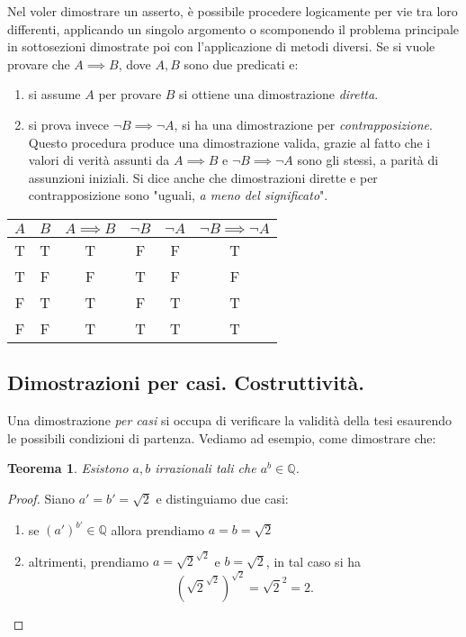 \documentclass[fontsize = 11 pt, paper=A4, oneside, index=totoc, hyperref]{article}
\theoremstyle{definition}
\theoremstyle{plain}
\newtheorem{thm}{Teorema}[section]
\begin{document}
Nel voler dimostrare un asserto, è possibile procedere logicamente per vie tra loro differenti, applicando un singolo argomento o scomponendo il problema principale in sottosezioni dimostrate poi con l'applicazione di metodi diversi.
Se si vuole provare che \(A \implies B\), dove \(A,B\) sono due predicati e:
\begin{enumerate}
  \item si assume \(A\) per provare \(B\) si ottiene una dimostrazione \emph{diretta}.
  \item si prova invece \(\lnot B \implies \lnot A\), si ha una dimostrazione per \emph{contrapposizione}. Questo procedura produce una dimostrazione valida, grazie al fatto che i valori di verità assunti da \(A \implies B\) e \(\lnot B \implies \lnot A\) sono gli stessi, a parità di assunzioni iniziali. Si dice anche che dimostrazioni dirette e per contrapposizione sono "uguali, \emph{a meno del significato}".
\end{enumerate}
\begin{center}
\begin{tabular}{c|c|c||c|c|c}
  \(A\) & \(B\) & \(A \implies B\) & \(\lnot B\) & \(\lnot A\) & \(\lnot B \implies \lnot A\) \\ \hline
  T & T & T & F & F & T \\
  T & F & F & T & F & F \\
  F & T & T & F & T & T \\
  F & F & T & T & T & T
\end{tabular}
\end{center}

\subsection{Dimostrazioni per casi. Costruttività.}

Una dimostrazione \emph{per casi} si occupa di verificare la validità della tesi esaurendo le possibili condizioni di partenza. Vediamo ad esempio, come dimostrare che:

\begin{thm}
  Esistono \(a,b\) irrazionali tali che \(a^b \in \mathbb{Q}\).
\end{thm}
\begin{proof}
  Siano \(a' = b' = \sqrt{2}\) e distinguiamo due casi:
  \begin{enumerate}
    \item se \((a')^{b'} \in \mathbb{Q}\) allora prendiamo \(a = b = \sqrt{2}\)
    \item altrimenti, prendiamo \(a = \sqrt{2}^{\sqrt{2}}\) e \(b = \sqrt{2}\), in tal caso si ha
    \[
    \left(\sqrt{2}^{\sqrt{2}}\right)^{\sqrt{2}} = \sqrt{2}^2 = 2.
    \]
  \end{enumerate}
\end{proof}
\end{document}
